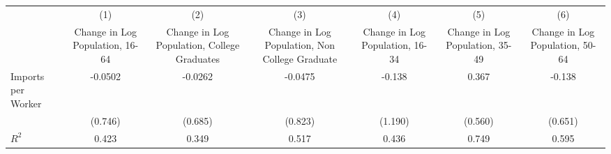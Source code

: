 {
\def\sym#1{\ifmmode^{#1}\else\(^{#1}\)\fi}
\begin{tabular}{l*{6}{c}}
\hline\hline
                    &\multicolumn{1}{c}{(1)}&\multicolumn{1}{c}{(2)}&\multicolumn{1}{c}{(3)}&\multicolumn{1}{c}{(4)}&\multicolumn{1}{c}{(5)}&\multicolumn{1}{c}{(6)}\\
                    &\multicolumn{1}{c}{Change in Log Population, 16-64}&\multicolumn{1}{c}{Change in Log Population, College Graduates}&\multicolumn{1}{c}{Change in Log Population, Non College Graduate}&\multicolumn{1}{c}{Change in Log Population, 16-34}&\multicolumn{1}{c}{Change in Log Population, 35-49}&\multicolumn{1}{c}{Change in Log Population, 50-64}\\
\hline
Imports per Worker  &     -0.0502   &     -0.0262   &     -0.0475   &      -0.138   &       0.367   &      -0.138   \\
                    &     (0.746)   &     (0.685)   &     (0.823)   &     (1.190)   &     (0.560)   &     (0.651)   \\
\hline
\(R^{2}\)           &       0.423   &       0.349   &       0.517   &       0.436   &       0.749   &       0.595   \\
\hline\hline
\end{tabular}
}
